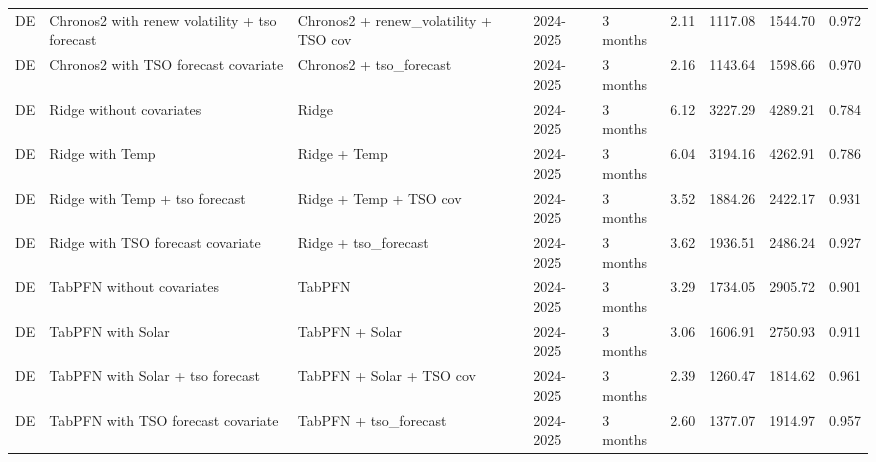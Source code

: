 \begin{longtable}{lllllllll}
DE & Chronos2 with renew volatility + tso forecast & Chronos2 + renew\_volatility + TSO cov & 2024-2025 & 3 months & 2.11 & 1117.08 & 1544.70 & 0.972 \\
DE & Chronos2 with TSO forecast covariate & Chronos2 + tso\_forecast & 2024-2025 & 3 months & 2.16 & 1143.64 & 1598.66 & 0.970 \\
DE & Ridge without covariates & Ridge & 2024-2025 & 3 months & 6.12 & 3227.29 & 4289.21 & 0.784 \\
DE & Ridge with Temp & Ridge + Temp & 2024-2025 & 3 months & 6.04 & 3194.16 & 4262.91 & 0.786 \\
DE & Ridge with Temp + tso forecast & Ridge + Temp + TSO cov & 2024-2025 & 3 months & 3.52 & 1884.26 & 2422.17 & 0.931 \\
DE & Ridge with TSO forecast covariate & Ridge + tso\_forecast & 2024-2025 & 3 months & 3.62 & 1936.51 & 2486.24 & 0.927 \\
DE & TabPFN without covariates & TabPFN & 2024-2025 & 3 months & 3.29 & 1734.05 & 2905.72 & 0.901 \\
DE & TabPFN with Solar & TabPFN + Solar & 2024-2025 & 3 months & 3.06 & 1606.91 & 2750.93 & 0.911 \\
DE & TabPFN with Solar + tso forecast & TabPFN + Solar + TSO cov & 2024-2025 & 3 months & 2.39 & 1260.47 & 1814.62 & 0.961 \\
DE & TabPFN with TSO forecast covariate & TabPFN + tso\_forecast & 2024-2025 & 3 months & 2.60 & 1377.07 & 1914.97 & 0.957 \\
\end{longtable}
